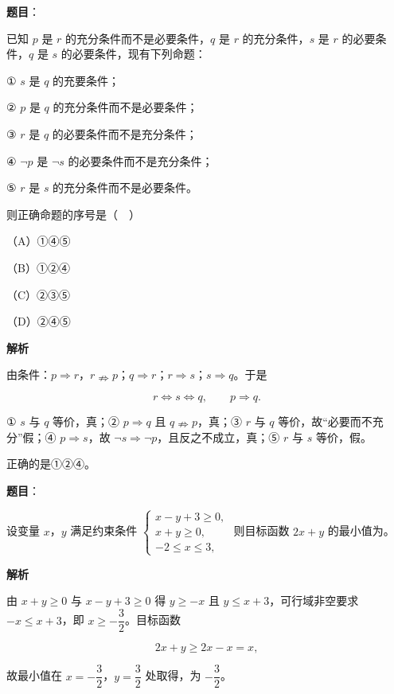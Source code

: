 \begin{answer}

\textbf{题目}：

已知 $p$ 是 $r$ 的充分条件而不是必要条件，$q$ 是 $r$ 的充分条件，$s$ 是 $r$ 的必要条件，$q$ 是 $s$ 的必要条件，现有下列命题：

① $s$ 是 $q$ 的充要条件；

② $p$ 是 $q$ 的充分条件而不是必要条件；

③ $r$ 是 $q$ 的必要条件而不是充分条件；

④ $\neg p$ 是 $\neg s$ 的必要条件而不是充分条件；

⑤ $r$ 是 $s$ 的充分条件而不是必要条件。

则正确命题的序号是（　）

（A）①④⑤

（B）①②④

（C）②③⑤

（D）②④⑤

\textbf{解析}

由条件：$p\Rightarrow r$，$r\nRightarrow p$；$q\Rightarrow r$；$r\Rightarrow s$；$s\Rightarrow q$。于是

\nopagebreak[4]
\[r\Leftrightarrow s\Leftrightarrow q,\qquad p\Rightarrow q.\]

① $s$ 与 $q$ 等价，真；② $p\Rightarrow q$ 且 $q\nRightarrow p$，真；③ $r$ 与 $q$ 等价，故“必要而不充分”假；④ $p\Rightarrow s$，故 $\neg s\Rightarrow\neg p$，且反之不成立，真；⑤ $r$ 与 $s$ 等价，假。

正确的是①②④。


\end{answer}
\begin{answer}

\textbf{题目}：

设变量 $x$，$y$ 满足约束条件 $\begin{cases}x-y+3\geqslant0,\\ x+y\geqslant0,\\ -2\leqslant x\leqslant3,\end{cases}$ 则目标函数 $2x+y$ 的最小值为\gkblank{}。

\textbf{解析}

由 $x+y\geqslant0$ 与 $x-y+3\geqslant0$ 得 $y\geqslant-x$ 且 $y\leqslant x+3$，可行域非空要求 $-x\leqslant x+3$，即 $x\geqslant-\dfrac32$。目标函数

\nopagebreak[4]
\[2x+y\geqslant2x-x=x,\]

故最小值在 $x=-\dfrac32$，$y=\dfrac32$ 处取得，为 $-\dfrac32$。


\end{answer}
